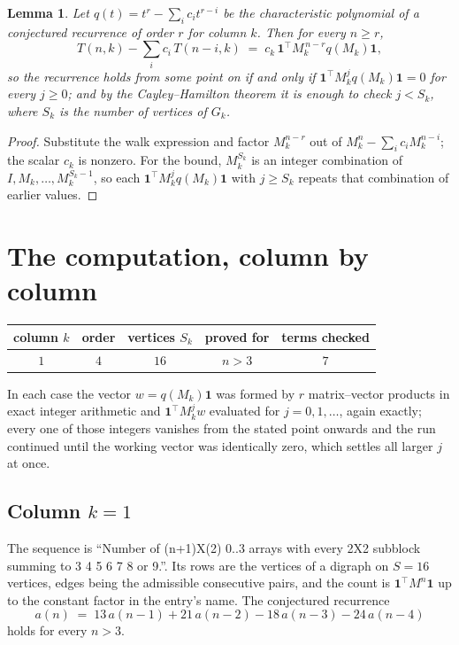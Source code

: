 \documentclass[11pt,a4paper]{article}
\theoremstyle{plain}
\newtheorem{lemma}[theorem]{Lemma}
\theoremstyle{definition}
\begin{document}
\begin{lemma}\label{lem:crit}
Let $q(t)=t^{r}-\sum_i c_it^{r-i}$ be the characteristic polynomial of a conjectured
recurrence of order $r$ for column $k$. Then for every $n\ge r$,
\[
T(n,k)-\sum_i c_i\,T(n-i,k)\;=\;c_k\,\mathbf{1}^{\!\top}M_k^{\,n-r}q(M_k)\mathbf{1},
\]
so the recurrence holds from some point on if and only if
$\mathbf{1}^{\!\top}M_k^{j}q(M_k)\mathbf{1}=0$ for every $j\ge0$; and by the
Cayley--Hamilton theorem it is enough to check $j<S_k$, where $S_k$ is the number of vertices
of $G_k$.
\end{lemma}

\begin{proof}
Substitute the walk expression and factor $M_k^{n-r}$ out of $M_k^{n}-\sum_ic_iM_k^{n-i}$;
the scalar $c_k$ is nonzero. For the bound, $M_k^{S_k}$ is an integer combination of
$I,M_k,\dots,M_k^{S_k-1}$, so each $\mathbf{1}^{\!\top}M_k^{j}q(M_k)\mathbf{1}$ with
$j\ge S_k$ repeats that combination of earlier values.
\end{proof}

\section{The computation, column by column}

\begin{center}
\begin{tabular}{ccccc}
column $k$ & order & vertices $S_k$ & proved for & terms checked \\ \hline
$1$ & $4$ & $16$ & $n>3$ & $7$ \\
\end{tabular}
\end{center}

In each case the vector $w=q(M_k)\mathbf{1}$ was formed by $r$ matrix--vector products in
exact integer arithmetic and $\mathbf{1}^{\!\top}M_k^{j}w$ evaluated for $j=0,1,\dots$,
again exactly; every one of those integers vanishes from the stated point onwards and the run
continued until the working vector was identically zero, which settles all larger $j$ at once.

\subsection*{Column $k=1$}
The sequence is ``Number of (n+1)X(2) 0..3 arrays with every 2X2 subblock summing to 3 4 5 6 7 8 or 9.''. Its rows are the vertices of a digraph on
$S=16$ vertices, edges being the admissible consecutive pairs, and the count is
$\mathbf{1}^{\!\top}M^{n}\mathbf{1}$ up to the constant factor in the entry's name.
The conjectured recurrence
\[
a(n)\;=\;13\,a(n-1) + 21\,a(n-2) - 18\,a(n-3) - 24\,a(n-4)
\]
holds for every $n>3$.
\end{document}
